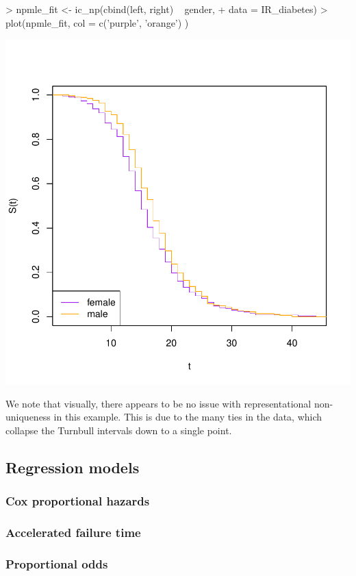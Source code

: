 \documentclass[a4paper]{article}
\begin{document}
\begin{Schunk}
\begin{Sinput}
> npmle_fit <- ic_np(cbind(left, right) ~ gender, 
+                    data = IR_diabetes)
> plot(npmle_fit, col = c('purple', 'orange') )
\end{Sinput}
\end{Schunk}
\includegraphics{StatisticalBackground-005}

We note that visually, there appears to be no issue with representational non-uniqueness in this example. This is due to the many ties in the data, which collapse the Turnbull intervals down to a single point. 

  \subsection{Regression models}
  
    \subsubsection{Cox proportional hazards}
    
    \subsubsection{Accelerated failure time}
    
    \subsubsection{Proportional odds}
  
\end{document}
